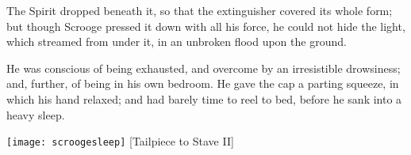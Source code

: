 The Spirit dropped beneath it, so that the extinguisher covered its whole form; but though Scrooge pressed it down with all his force, he could not hide the light, which streamed from under it, in an unbroken flood upon the ground.


He was conscious of being exhausted, and overcome by an irresistible drowsiness; and, further, of being in his own bedroom. He gave the cap a parting squeeze, in which his hand relaxed; and had barely time to reel to bed, before he sank into a heavy sleep.
\nopagebreak[4]
\begin{center}
\texttt{[image: scroogesleep]}
[Tailpiece to Stave II]{}
\end{center}